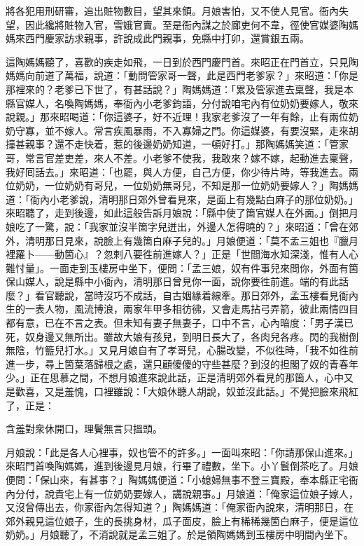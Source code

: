 將各犯用刑研審，追出賍物數目，望其來領。{}月娘害怕，又不使人見官。衙內失望，因此纔將賍物入官，雪娥官賣。至是衙內謀之於廊吏何不韋，徑使官媒婆陶媽媽來西門慶家訪求親事，許說成此門親事，免縣中打卯，還賞銀五兩。

這陶媽媽聽了，喜歡的疾走如飛，一日到於西門慶門首。來昭正在門首立，只見陶媽媽向前道了萬福，說道：「動問管家哥一聲，此是西門老爹家？」來昭道：「你是那裡來的？老爹已下世了，有甚話說？」陶媽媽道：「累及管家進去稟聲，我是本縣官媒人，名喚陶媽媽，奉衙內小老爹鈞語，分付說咱宅內有位奶奶要嫁人，敬來說親。」那來昭喝道：「你這婆子，好不近理！我家老爹沒了一年有餘，止有兩位奶奶守寡，並不嫁人。常言疾風暴雨，不入寡婦之門。你這媒婆，有要沒緊，走來胡撞甚親事？還不走快着，惹的後邊奶奶知道，一頓好打。」那陶媽媽笑道：「管家哥，常言官差吏差，來人不差。小老爹不使我，我敢來？嫁不嫁，起動進去稟聲，我好囘話去。」來昭道：「也罷，與人方便，自己方便，你少待片時，等我進去。兩位奶奶，一位奶奶有哥兒，一位奶奶無哥兒，不知是那一位奶奶要嫁人？」陶媽媽道：「衙內小老爹說，清明那日郊外曾看見來，是面上有幾點白麻子的那位奶奶。」來昭聽了，走到後邊，如此這般告訴月娘說：「縣中使了箇官媒人在外面。」倒把月娘吃了一驚，說：「我家並沒半箇字兒迸出，外邊人怎得曉的？」來昭道：「曾在郊外，清明那日見來，說臉上有幾箇白麻子兒的。」月娘便道：「莫不孟三姐也『臘月裡羅卜——動箇心』？忽剌八要徃前進嫁人？」正是「世間海水知深淺，惟有人心難忖量」。一面走到玉樓房中坐下，便問：「孟三娘，奴有件事兒來問你，外面有箇保山媒人，說是縣中小衙內，清明那日曾見你一面，說你要徃前進。端的有此話麼？」{}看官聽說，當時沒巧不成話，自古姻緣着線牽。那日郊外，孟玉樓看見衙內生的一表人物，風流博浪，兩家年甲多相彷彿，又會走馬拈弓弄箭，彼此兩情四目都有意，已在不言之表。但未知有妻子無妻子，口中不言，心內暗度：「男子漢已死，奴身邊又無所出。雖故大娘有孩兒，到明日長大了，各肉兒各疼。閃的我樹倒無陰，竹籃兒打水。」又見月娘自有了孝哥兒，心腸改變，不似徃時，「我不如徃前進一步，尋上箇葉落歸根之處，還只顧傻傻的守些甚麼？到沒的担閣了奴的青春年少。」正在思慕之間，不想月娘進來說此話，正是清明郊外看見的那箇人，心中又是歡喜，又是羞愧，口裡雖說：「大娘休聽人胡說，奴並沒此話。」不覺把臉來飛紅了，{}正是：

\begin{myquote}
含羞對衆休開口，理鬢無言只搵頭。
\end{myquote}

月娘說：「此是各人心裡事，奴也管不的許多。」一面叫來昭：「你請那保山進來。」來昭門首喚陶媽媽，進到後邊見月娘，行畢了禮數，坐下。小丫鬟倒茶吃了。月娘便問：「保山來，有甚事？」陶媽媽便道：「小媳婦無事不登三寶殿，奉本縣正宅衙內分付，說貴宅上有一位奶奶要嫁人，講說親事。」月娘道：「俺家這位娘子嫁人，又沒曾傳出去，你家衙內怎得知道？」陶媽媽道：「俺家衙內說來，清明那日，在郊外親見這位娘子，生的長挑身材，瓜子面皮，臉上有稀稀幾箇白麻子，便是這位奶奶。」月娘聽了，不消說就是孟三姐了。於是領陶媽媽到玉樓房中明間內坐下。

